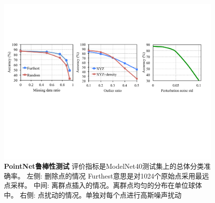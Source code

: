 \begin{figure}
    \centering
    \includegraphics[width=\linewidth]{fig/robustness.pdf}
    \caption{\textbf{PointNet鲁棒性测试} 评价指标是ModelNet40测试集上的总体分类准确率。 左侧: 删除点的情况 Furthest意思是对1024个原始点采用最远点采样。 中间: 离群点插入的情况。离群点均匀的分布在单位球体中。 右侧: 点扰动的情况。单独对每个点进行高斯噪声扰动}
    \label{fig:robustness}
\end{figure}

